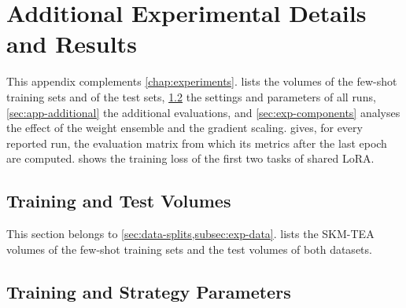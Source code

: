 
\chapter{Additional Experimental Details and Results}
\label{app:results}

This appendix complements \cref{chap:experiments}.
 lists the volumes of the few-shot training sets and of the test sets, \cref{sec:app-params} the settings and parameters of all runs, \cref{sec:app-additional} the additional evaluations, and \cref{sec:exp-components} analyses the effect of the weight ensemble and the gradient scaling.
 gives, for every reported run, the evaluation matrix from which its metrics after the last epoch are computed.
 shows the training loss of the first two tasks of shared LoRA.

\section{Training and Test Volumes}
\label{sec:app-volumes}

This section belongs to \cref{sec:data-splits,subsec:exp-data}.
 lists the SKM-TEA volumes of the few-shot training sets and the test volumes of both datasets.

\begin{table}[tb]
\centering
\caption[Few-shot training volumes and test volumes]{Few-shot training volumes and test volumes, named as in the dataset releases: SKM-TEA volumes by their scan identifier, AeroPath volumes by their case number. The full training split contains 108 SKM-TEA volumes.}
\label{tab:app-volumes}

\end{table}

\FloatBarrier
\section{Training and Strategy Parameters}
\label{sec:app-params}

